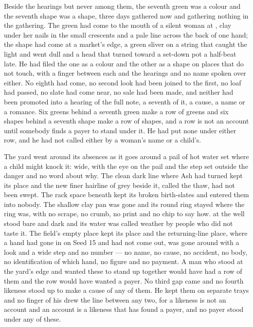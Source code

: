 Beside the hearings but never among them, the seventh green was a colour and the seventh shape was a shape, three days gathered now and gathering nothing in the gathering. The green had come to the mouth of a silent woman at , clay under her nails in the small crescents and a pale line across the back of one hand; the shape had come at a market's edge, a green sliver on a string that caught the light and went dull and a head that turned toward a set-down pot a half-beat late. He had filed the one as a colour and the other as a shape on places that do not touch, with a finger between each and the hearings and no name spoken over either. No eighth had come, no second look had been joined to the first, no loaf had passed, no slate had come near, no sale had been made, and neither had been promoted into a hearing of the full note, a seventh of it, a cause, a name or a romance. Six greens behind a seventh green make a row of greens and six shapes behind a seventh shape make a row of shapes, and a row is not an account until somebody finds a payer to stand under it. He had put none under either row, and he had not called either by a woman's name or a child's.

The yard went around its absences as it goes around a pail of hot water set where a child might knock it: wide, with the eye on the pail and the step set outside the danger and no word about why. The clean dark line where Ash had turned kept its place and the new finer hairline of grey beside it, called the thaw, had not been swept. The rack space beneath  kept its broken birth-slates and entered them into nobody. The shallow clay pan was gone and its round ring stayed where the ring was, with no scrape, no crumb, no print and no chip to say how.  at the well stood bare and dark and its water was called weather by people who did not taste it. The field's empty place kept its place and the returning-line place, where a hand had gone in on Seed 15 and had not come out, was gone around with a look and a wide step and no number --- no name, no cause, no accident, no body, no identification of which hand, no figure and no payment. A man who stood at the yard's edge and wanted these to stand up together would have had a row of them and the row would have wanted a payer. No third gap came and no fourth likeness stood up to make a cause of any of them. He kept them on separate trays and no finger of his drew the line between any two, for a likeness is not an account and an account is a likeness that has found a payer, and no payer stood under any of these.

